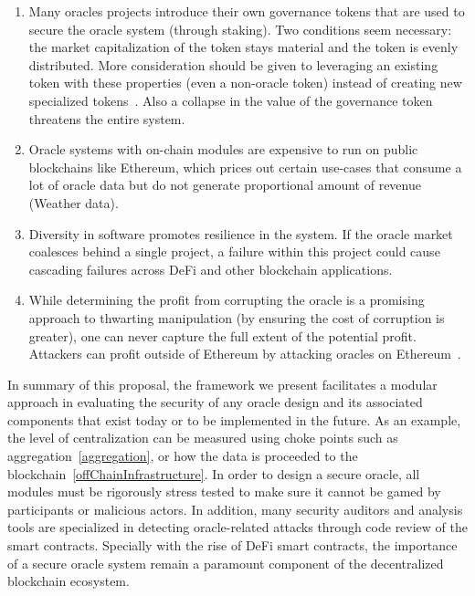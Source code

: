 \begin{enumerate}
    \item Many oracles projects introduce their own governance tokens that are used to secure the oracle system (\eg through staking). Two conditions seem necessary: the market capitalization of the token stays material and the token is evenly distributed. More consideration should be given to leveraging an existing token with these properties (even a non-oracle token) instead of creating new specialized tokens~\cite{vitalikuni}. Also a collapse in the value of the governance token threatens the entire system.

    \item Oracle systems with on-chain modules are expensive to run on public blockchains like Ethereum, which prices out certain use-cases that consume a lot of oracle data but do not generate proportional amount of revenue (\eg Weather data). 


    \item Diversity in software promotes resilience in the system. If the oracle market coalesces  behind a single project, a failure within this project could cause cascading failures across DeFi and other blockchain applications.  

    \item While determining the profit from corrupting the oracle is a promising approach to thwarting manipulation (by ensuring the cost of corruption is greater), one can never capture the full extent of the potential profit. Attackers can profit outside of Ethereum by attacking oracles on Ethereum~\cite{FoBo19}.

\end{enumerate}

In summary of this proposal, the framework we present facilitates a modular approach in evaluating the security of any oracle design and its associated components that exist today or to be implemented in the future. As an example, the level of centralization can be measured using choke points such as aggregation~\ref{aggregation}, or how the data is proceeded to the blockchain~\ref{offChainInfrastructure}. In order to design a secure oracle, all modules must be rigorously stress tested to make sure it cannot be gamed by participants or malicious actors. In addition, many security auditors and analysis tools are specialized in detecting oracle-related attacks through code review of the smart contracts. Specially with the rise of DeFi smart contracts, the importance of a secure oracle system remain a paramount component of the decentralized blockchain ecosystem.


